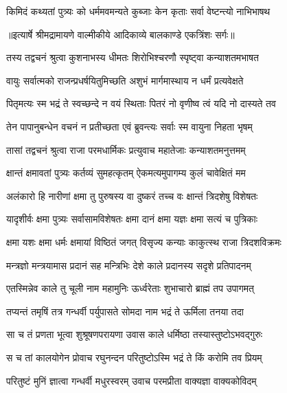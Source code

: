 \twolineshloka
{किमिदं कथ्यतां पुत्र्यः को धर्ममवमन्यते}
{कुब्जाः केन कृताः सर्वा वेष्टन्त्यो नाभिभाषथ} %


{॥इत्यार्षे श्रीमद्रामायणे वाल्मीकीये आदिकाव्ये बालकाण्डे एकत्रिंशः सर्गः॥}


\twolineshloka
{तस्य तद्वचनं श्रुत्वा कुशनाभस्य धीमतः}
{शिरोभिश्चरणौ स्पृष्ट्वा कन्याशतमभाषत} %

\twolineshloka
{वायुः सर्वात्मको राजन्प्रधर्षयितुमिच्छति}
{अशुभं मार्गमास्थाय न धर्मं प्रत्यवेक्षते} %

\twolineshloka
{पितृमत्यः स्म भद्रं ते स्वच्छन्दे न वयं स्थिताः}
{पितरं नो वृणीष्व त्वं यदि नो दास्यते तव} %

\twolineshloka
{तेन पापानुबन्धेन वचनं न प्रतीच्छता}
{एवं ब्रुवन्त्यः सर्वाः स्म वायुना निहता भृषम्} %

\twolineshloka
{तासां तद्वचनं श्रुत्वा राजा परमधार्मिकः}
{प्रत्युवाच महातेजाः कन्याशतमनुत्तमम्} %

\twolineshloka
{क्षान्तं क्षमावतां पुत्र्यः कर्तव्यं सुमहत्कृतम्}
{ऐकमत्यमुपागम्य कुलं चावेक्षितं मम} %

\twolineshloka
{अलंकारो हि नारीणां क्षमा तु पुरुषस्य वा}
{दुष्करं तच्च वः क्षान्तं त्रिदशेषु विशेषतः} %

\twolineshloka
{यादृशीर्वः क्षमा पुत्र्यः सर्वासामविशेषतः}
{क्षमा दानं क्षमा यज्ञः क्षमा सत्यं च पुत्रिकाः} %

\twolineshloka
{क्षमा यशः क्षमा धर्मः क्षमायां विष्ठितं जगत्}
{विसृज्य कन्याः काकुत्स्थ राजा त्रिदशविक्रमः} %

\twolineshloka
{मन्त्रज्ञो मन्त्रयामास प्रदानं सह मन्त्रिभिः}
{देशे काले प्रदानस्य सदृशे प्रतिपादनम्} %

\twolineshloka
{एतस्मिन्नेव काले तु चूली नाम महामुनिः}
{ऊर्ध्वरेताः शुभाचारो ब्राह्मं तप उपागमत्} %

\twolineshloka
{तप्यन्तं तमृषिं तत्र गन्धर्वी पर्युपासते}
{सोमदा नाम भद्रं ते ऊर्मिला तनया तदा} %

\twolineshloka
{सा च तं प्रणता भूत्वा शुश्रूषणपरायणा}
{उवास काले धर्मिष्ठा तस्यास्तुष्टोऽभवद्गुरुः} %

\twolineshloka
{स च तां कालयोगेन प्रोवाच रघुनन्दन}
{परितुष्टोऽस्मि भद्रं ते किं करोमि तव प्रियम्} %

\twolineshloka
{परितुष्टं मुनिं ज्ञात्वा गन्धर्वी मधुरस्वरम्}
{उवाच परमप्रीता वाक्यज्ञा वाक्यकोविदम्} %


